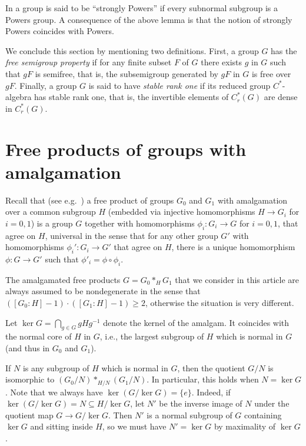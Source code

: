 \documentclass[a4paper]{amsart}
\theoremstyle{plain}
\theoremstyle{definition}
\theoremstyle{remark}
\numberwithin{theorem}{section}
\begin{document}
In \cite{HP} a group is said to be ``strongly Powers'' if every subnormal subgroup is a Powers group.
A consequence of the above lemma is that the notion of strongly Powers coincides with Powers.

\medskip

We conclude this section by mentioning two definitions.
First, a group $G$ has the \emph{free semigroup property} if for any finite subset $F$ of $G$ there exists $g$ in $G$
such that $gF$ is semifree, that is, the subsemigroup generated by $gF$ in $G$ is free over $gF$.
Finally, a group $G$ is said to have \emph{stable rank one} if its reduced group $C^*$-algebra has stable rank one, that is,
the invertible elements of $C^*_r(G)$ are dense in $C^*_r(G)$.


\section{Free products of groups with amalgamation}

Recall that (see e.g.\ \cite{Serre}) a free product of groups $G_0$ and $G_1$ with amalgamation over a common subgroup $H$
(embedded via injective homomorphisms $H \to G_i$ for $i=0,1$)
is a group $G$ together with homomorphisms $\phi_i \colon G_i \to G$ for $i=0,1$, that agree on $H$,
universal in the sense that for any other group $G'$ with homomorphisms $\phi_i' \colon G_i \to G'$ that agree on $H$,
there is a unique homomorphism $\phi \colon G \to G'$ such that $\phi'_i = \phi \circ \phi_i$.

The amalgamated free products $G = G_0 *_H G_1$ that we consider in this article
are always assumed to be nondegenerate in the sense that $([G_0 : H]-1) \cdot ([G_1 : H]-1) \geq 2$,
otherwise the situation is very different.

Let $\ker G = \bigcap_{g \in G}gHg^{-1}$ denote the kernel of the amalgam.
It coincides with the normal core of $H$ in $G$,
i.e., the largest subgroup of $H$ which is normal in $G$ (and thus in $G_0$ and $G_1$).

If $N$ is any subgroup of $H$ which is normal in $G$,
then the quotient $G/N$ is isomorphic to $(G_0/N)*_{H/N}(G_1/N)$.
In particular, this holds when $N=\ker G$.
Note that we always have $\ker(G/\ker G)=\{e\}$.
Indeed, if $\ker(G/\ker G)=N\subseteq H/\ker G$, let $N'$ be the inverse image of $N$ under the quotient map $G\to G/\ker G$.
Then $N'$ is a normal subgroup of $G$ containing $\ker G$ and sitting inside $H$,
so we must have $N'=\ker G$ by maximality of $\ker G$.
\end{document}
